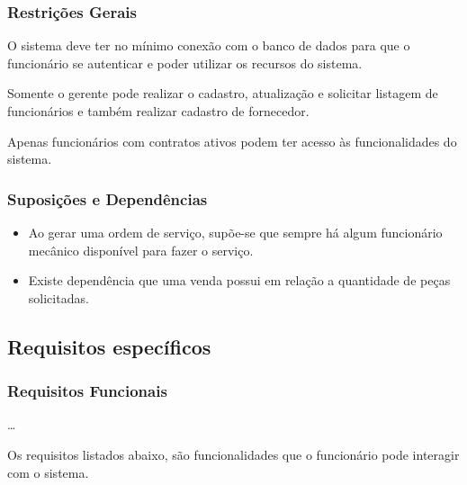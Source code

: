 	\subsubsection{Restrições Gerais}
	\par
	O sistema deve ter no mínimo conexão com o banco de dados para que o funcionário se autenticar e poder utilizar os recursos do sistema. 
	\par
	Somente o gerente pode realizar o cadastro, atualização  e solicitar listagem de funcionários e também realizar cadastro de fornecedor.
	\par
	Apenas funcionários com contratos ativos podem ter acesso às funcionalidades do sistema.

	
	\subsubsection{Suposições e Dependências}
		\begin{itemize}
			\item Ao gerar uma ordem  de serviço, supõe-se que sempre há algum funcionário mecânico disponível para fazer o serviço.
			\item Existe dependência que uma venda possui em relação a quantidade de peças solicitadas.			
		\end{itemize}
	
	
\subsection{Requisitos específicos}

\subsubsection{Requisitos Funcionais}
\ldots

\par
Os requisitos listados abaixo, são funcionalidades que o funcionário pode interagir com o sistema.

